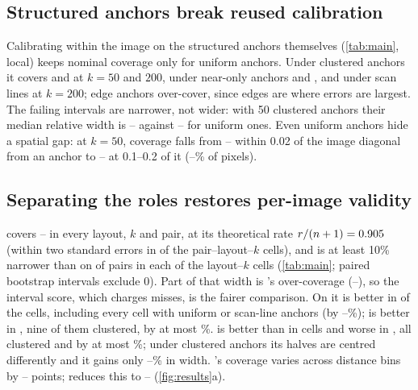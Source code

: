 \subsection{Structured anchors break reused calibration}
\label{sec:res:failure}
Calibrating within the image on the structured anchors themselves (\cref{tab:main}, \textsf{local}) keeps nominal coverage only for uniform anchors.
Under clustered anchors it covers  and  at $k=50$ and $200$, under near-only anchors  and , and under scan lines  at $k=200$; edge anchors over-cover, since edges are where errors are largest.
The failing intervals are narrower, not wider: with 50 clustered anchors their median relative width is \NumLocalClusterWidthLo--\NumLocalClusterWidthHi{} against \NumLocalUnifWidthLo--\NumLocalUnifWidthHi{} for uniform ones.
Even uniform anchors hide a spatial gap: at $k=50$, coverage falls from \NumLocalNearBinCovLo--\NumLocalNearBinCovHi{} within 0.02 of the image diagonal from an anchor to \NumLocalFarBinCovLo--\NumLocalFarBinCovHi{} at 0.1--0.2 of it (\NumLocalFarBinShareLo--\NumLocalFarBinShareHi\% of pixels).

\subsection{Separating the roles restores per-image validity}
\label{sec:res:dual}
\mDual covers \NumDualCovLo--\NumDualCovHi{} in every layout, $k$ and pair, at its theoretical rate $r/(n+1)=0.905$ (within two standard errors in \NumDualExactCells{} of the \NumAllCells{} pair--layout--$k$ cells), and is at least 10\% narrower than \mDistBoth on \NumDualGatePairs{} of \NumPairs{} pairs in each of the \NumCells{} layout--$k$ cells (\cref{tab:main}; paired bootstrap intervals exclude 0).
Part of that width is \mDistBoth's over-coverage (\NumDistBothCovLo--\NumDistBothCovHi), so the interval score, which charges misses, is the fairer comparison.
On it \mDual is better in \NumDualISWins{} of the \NumAllCells{} cells, including every cell with uniform or scan-line anchors (by \NumDualISGainURLo--\NumDualISGainURHi\%); \mDistBoth is better in \NumDualISLosses, nine of them clustered, by at most \NumDualISLoseMax\%.
\mDualBoth is better than \mDistBoth in \NumDualBothISWins{} cells and worse in \NumDualBothISLosses, all clustered and by at most \NumDualBothISLoseMax\%; under clustered anchors its halves are centred differently and it gains only \NumDualBothClusterWidthLo--\NumDualBothClusterWidthHi\% in width.
\mDual's coverage varies across distance bins by \NumSpreadDualLo--\NumSpreadDualHi{} points; \mDualBoth reduces this to \NumSpreadDualBothLo--\NumSpreadDualBothHi{} (\cref{fig:results}a).

